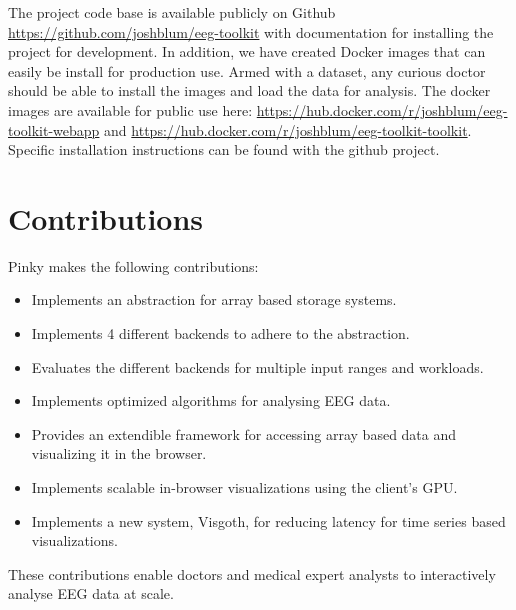 The project code base is available publicly on Github \cite{github}
\url{https://github.com/joshblum/eeg-toolkit} with documentation for installing
the project for development. In addition, we have created Docker \cite{docker}
images that can easily be install for production use. Armed with a dataset, any
curious doctor should be able to install the images and load the data for
analysis. The docker images are available for public use here:
\url{https://hub.docker.com/r/joshblum/eeg-toolkit-webapp} and
\url{https://hub.docker.com/r/joshblum/eeg-toolkit-toolkit}. Specific
installation instructions can be found with the github project.

\section{Contributions}

Pinky makes the following contributions:

\begin{itemize}

  \item Implements an abstraction for array based storage systems.

  \item Implements 4 different backends to adhere to the abstraction.

  \item Evaluates the different backends for multiple input ranges and
    workloads.

  \item Implements optimized algorithms for analysing EEG data.

  \item Provides an extendible framework for accessing array based data and
    visualizing it in the browser.

  \item Implements scalable in-browser visualizations using the client's GPU.

  \item Implements a new system, Visgoth, for reducing latency for time series
    based visualizations.

\end{itemize}

These contributions enable doctors and medical expert analysts to interactively
analyse EEG data at scale.

